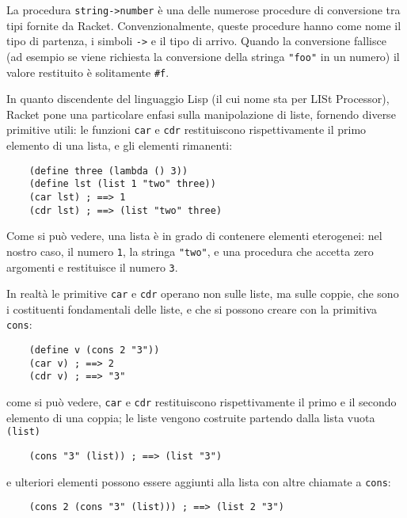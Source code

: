 La procedura \lstinline{string->number} \`e una delle numerose procedure
di conversione tra tipi fornite da Racket. Convenzionalmente, queste
procedure hanno come nome il tipo di partenza, i simboli \lstinline{->}
e il tipo di arrivo. Quando la conversione fallisce (ad esempio se viene
richiesta la conversione della stringa \lstinline{"foo"} in un numero)
il valore restituito \`e solitamente \lstinline{#f}.

In quanto discendente del linguaggio Lisp (il cui nome sta per LISt
Processor), Racket pone una particolare enfasi sulla manipolazione di
liste, fornendo diverse primitive utili: le funzioni \lstinline{car} e
\lstinline{cdr} restituiscono rispettivamente il primo elemento di una
lista, e gli elementi rimanenti:

\begin{lstlisting}
    (define three (lambda () 3))
    (define lst (list 1 "two" three))
    (car lst) ; ==> 1
    (cdr lst) ; ==> (list "two" three)
\end{lstlisting}

Come si pu\`o vedere, una lista \`e in grado di contenere elementi
eterogenei: nel nostro caso, il numero \lstinline{1}, la stringa
\lstinline{"two"}, e una procedura che accetta zero argomenti e restituisce
il numero \lstinline{3}.

In realt\`a le primitive \lstinline{car} e \lstinline{cdr} operano non
sulle liste, ma sulle coppie, che sono i costituenti fondamentali delle
liste, e che si possono creare con la primitiva \lstinline{cons}:

\begin{lstlisting}
    (define v (cons 2 "3"))
    (car v) ; ==> 2
    (cdr v) ; ==> "3"
\end{lstlisting}

come si pu\`o vedere, \lstinline{car} e \lstinline{cdr} restituiscono
rispettivamente il primo e il secondo elemento di una coppia; le liste
vengono costruite partendo dalla lista vuota \lstinline{(list)}

\begin{lstlisting}
    (cons "3" (list)) ; ==> (list "3")
\end{lstlisting}

e ulteriori elementi possono essere aggiunti alla lista con altre chiamate
a \lstinline{cons}:

\begin{lstlisting}
    (cons 2 (cons "3" (list))) ; ==> (list 2 "3")
\end{lstlisting}


